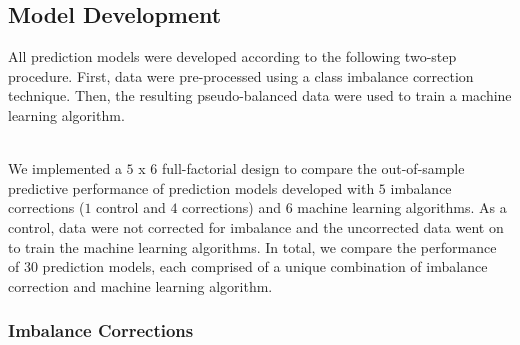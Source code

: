 \documentclass[AMA,STIX1COL,]{WileyNJD-v2}
\begin{document}
\hypertarget{model-development}{%
\subsection{Model Development}\label{model-development}}

\hfill\break
All prediction models were developed according to the following two-step
procedure. First, data were pre-processed using a class imbalance
correction technique. Then, the resulting pseudo-balanced data were used
to train a machine learning algorithm.\\
\strut \\
We implemented a \(5\) x \(6\) full-factorial design to compare the
out-of-sample predictive performance of prediction models developed with
\(5\) imbalance corrections (\(1\) control and \(4\) corrections) and
\(6\) machine learning algorithms. As a control, data were not corrected
for imbalance and the uncorrected data went on to train the machine
learning algorithms. In total, we compare the performance of 30
prediction models, each comprised of a unique combination of imbalance
correction and machine learning algorithm.

\hypertarget{imbalance-corrections}{%
\subsubsection{Imbalance Corrections}\label{imbalance-corrections}}
\end{document}
